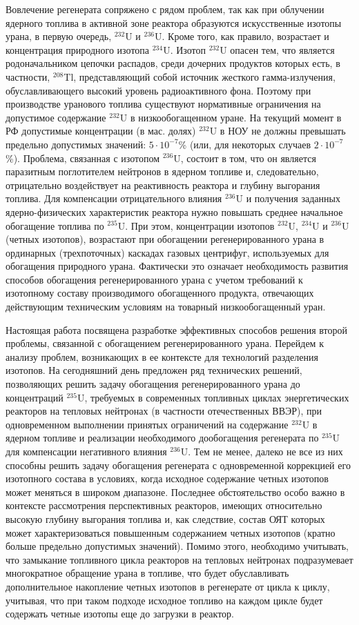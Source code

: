 Вовлечение регенерата сопряжено с рядом проблем, так как при облучении ядерного топлива в активной зоне реактора образуются искусственные изотопы урана, в первую очередь, $^{232}$U и $^{236}$U. Кроме того, как правило, возрастает и концентрация природного изотопа $^{234}$U. Изотоп $^{232}$U опасен тем, что является родоначальником цепочки распадов, среди дочерних продуктов которых есть,  в частности, $^{208}$Tl, представляющий собой источник жесткого гамма-излучения, обуславливающего высокий уровень радиоактивного фона. Поэтому при производстве уранового топлива существуют нормативные ограничения на допустимое содержание $^{232}$U в низкообогащенном уране. На текущий момент в РФ допустимые концентрации (в мас. долях) $^{232}$U в НОУ не должны превышать предельно допустимых значений: $5\cdot10^{-7}$\% (или, для некоторых случаев $2\cdot10^{-7}$\%). Проблема, связанная с изотопом $^{236}$U, состоит в том, что он является паразитным поглотителем нейтронов в ядерном топливе и, следовательно, отрицательно воздействует на реактивность реактора и глубину выгорания топлива. Для компенсации отрицательного влияния $^{236}$U и получения заданных ядерно-физических характеристик реактора нужно повышать среднее начальное обогащение топлива по $^{235}$U.  При этом, концентрации изотопов $^{232}$U, $^{234}$U и $^{236}$U (четных изотопов), возрастают при обогащении регенерированного урана в ординарных (трехпоточных) каскадах газовых центрифуг, используемых для обогащения природного урана. Фактически это означает необходимость развития способов обогащения регенерированного урана с учетом требований к изотопному составу производимого обогащенного продукта, отвечающих действующим техническим условиям на товарный низкообогащенный уран.

Настоящая работа посвящена разработке эффективных способов решения второй проблемы, связанной с обогащением регенерированного урана.
Перейдем к анализу проблем, возникающих в ее контексте для технологий разделения изотопов. На сегодняшний день предложен ряд технических решений, позволяющих решить задачу обогащения регенерированного урана до концентраций $^{235}$U, требуемых в современных топливных циклах энергетических реакторов на тепловых нейтронах (в частности отечественных ВВЭР), при одновременном выполнении принятых ограничений на содержание $^{232}$U в ядерном топливе и реализации необходимого дообогащения регенерата по $^{235}$U для компенсации негативного влияния $^{236}$U. Тем не менее, далеко не все из них способны решить задачу обогащения регенерата с одновременной коррекцией его изотопного состава в условиях, когда исходное содержание четных изотопов может меняться в широком диапазоне. Последнее обстоятельство особо важно в контексте рассмотрения перспективных реакторов, имеющих относительно высокую глубину выгорания топлива и, как следствие, состав ОЯТ которых может характеризоваться повышенным содержанием четных изотопов (кратно больше предельно допустимых значений). Помимо этого, необходимо учитывать, что замыкание топливного цикла реакторов на тепловых нейтронах подразумевает многократное обращение урана в топливе, что будет обуславливать дополнительное накопление четных изотопов в регенерате от цикла к циклу, учитывая, что при таком подходе исходное топливо на каждом цикле будет содержать четные изотопы еще до загрузки в реактор.

